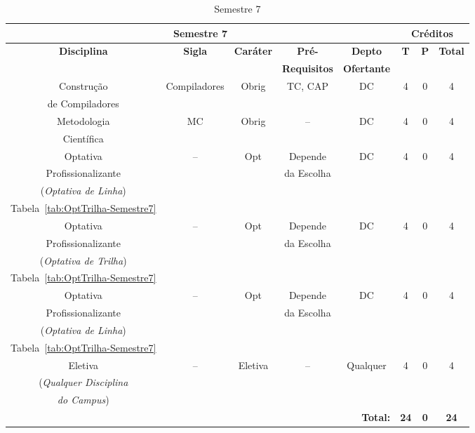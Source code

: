 
\begin{table}[H]
\caption{Semestre 7}
\centering
\footnotesize
\begin{tabular}{|c|c|c|c|c|c|c|c|} %
\hline
\hline
\multicolumn{5}{|c|}{\textbf{Semestre 7}}  &  \multicolumn{3}{|c|}{\textbf{Créditos}} \\
\hline
\hline
\textbf{Disciplina} & \textbf{Sigla} & \textbf{Caráter} & \textbf{Pré-} & \textbf{Depto} &  \textbf{T}  &  \textbf{P}  & \textbf{Total} \\ 
& & & \textbf{Requisitos}  & \textbf{Ofertante} & & & \\
\hline 

Construção & Compiladores & Obrig & TC, CAP & DC & 4 & 0 & 4 \\
de Compiladores & & & & & & &  \\

\hline

Metodologia & MC & Obrig & -- & DC & 4 & 0 & 4 \\
Científica & & & & & & &  \\
\hline

Optativa & --  & Opt & Depende & DC  & 4 & 0 & 4 \\
Profissionalizante & & & da Escolha & & & & \\
(\textit{Optativa de Linha}) & & & & & & & \\
Tabela~\ref{tab:OptTrilha-Semestre7} & & & & & & & \\
\hline

Optativa & --  & Opt & Depende & DC  & 4 & 0 & 4 \\
Profissionalizante & & & da Escolha & & & & \\
(\textit{Optativa de Trilha}) & & & & & & & \\
Tabela~\ref{tab:OptTrilha-Semestre7} & & & & & & & \\
\hline


Optativa & --  & Opt & Depende & DC  & 4 & 0 & 4 \\
Profissionalizante & & & da Escolha & & & & \\
(\textit{Optativa de Linha}) & & & & & & & \\
Tabela~\ref{tab:OptTrilha-Semestre7} & & & & & & & \\
\hline

Eletiva  & --  & Eletiva & -- & Qualquer & 4 & 0 & 4 \\
(\textit{Qualquer Disciplina} & & & & & & & \\
\textit{do Campus}) & & & & & & & \\
\hline




\hline


\hline
\hline
\multicolumn{5}{|r|}{\textbf{Total:}}  &  \textbf{24}  &  \textbf{0}   & \textbf{24} \\ %
\hline
\hline
\end{tabular}
\label{tab:matriz7}
\end{table}


